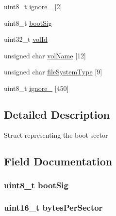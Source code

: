 \begin{DoxyCompactItemize}
\item 
uint8\+\_\+t \hyperlink{structboot__sector_a85aa9de3f0400bf29bff2bf715f50054}{ignore\+\_} \mbox{[}2\mbox{]}
\item 
uint8\+\_\+t \hyperlink{structboot__sector_a6c8098ef528b68696452b3caeaced159}{boot\+Sig}
\item 
uint32\+\_\+t \hyperlink{structboot__sector_a86483b972623ebdcf816ef6fc098c1c6}{vol\+Id}
\item 
unsigned char \hyperlink{structboot__sector_abf99e855e09d7505a608b31f619535a6}{vol\+Name} \mbox{[}12\mbox{]}
\item 
unsigned char \hyperlink{structboot__sector_a490bf602a1750aea0d5bdb7c64a0f08e}{file\+System\+Type} \mbox{[}9\mbox{]}
\item 
uint8\+\_\+t \hyperlink{structboot__sector_a04c57fb0a1efb4695f297caae351f295}{ignore\+\_} \mbox{[}450\mbox{]}
\end{DoxyCompactItemize}


\subsection{Detailed Description}
Struct representing the boot sector 

\subsection{Field Documentation}
\subsubsection[{\texorpdfstring{boot\+Sig}{bootSig}}]{\setlength{\rightskip}{0pt plus 5cm}uint8\+\_\+t boot\+Sig}\hypertarget{structboot__sector_a6c8098ef528b68696452b3caeaced159}{}\label{structboot__sector_a6c8098ef528b68696452b3caeaced159}
\subsubsection[{\texorpdfstring{bytes\+Per\+Sector}{bytesPerSector}}]{\setlength{\rightskip}{0pt plus 5cm}uint16\+\_\+t bytes\+Per\+Sector}\hypertarget{structboot__sector_adb2ddeae74baf681103d21d724814a63}{}\label{structboot__sector_adb2ddeae74baf681103d21d724814a63}
